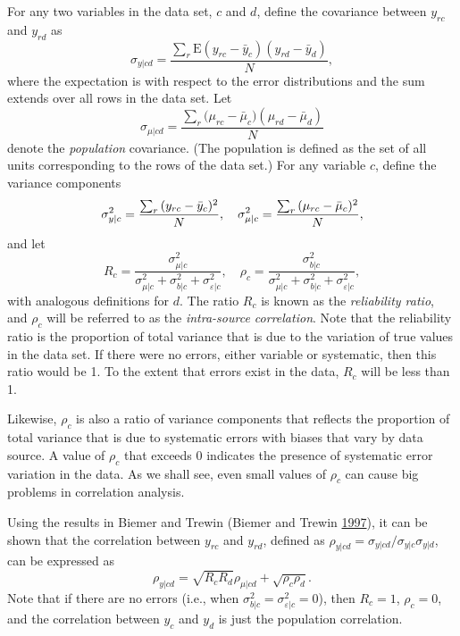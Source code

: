 \documentclass[]{krantz}
\begin{document}
For any two variables in the data set, \(c\) and \(d\), define the
covariance between \(y_{rc}\) and \(y_{rd}\) as \[\label{eq:10-1.6}
\sigma_{y\vert cd} = \frac{\sum\nolimits_r {\mbox{E}(y_{rc} -
\bar{y}_c )(y_{rd} - \bar {y}_d )} }{N},\] where the expectation is with
respect to the error distributions and the sum extends over all rows in
the data set. Let
\[\sigma_{\mu \vert cd} = \frac{\sum\nolimits_r {(\mu_{rc} - \bar{\mu
}_c } )(\mu_{rd} - \bar{\mu }_d )}{N}\] denote the \emph{population}
covariance. (The population is defined as the set of all units
corresponding to the rows of the data set.) For any variable \(c\),
define the variance components
\[\sigma_{y\vert c}^2 = \frac{\sum_r {(y_{rc} -
\bar{y}_c )^2}}{N},\quad \sigma_{\mu \vert c}^2 =\frac{%
\sum_r {(\mu_{rc} - \bar {\mu }_c } )^2}{N},\] and let \[R_c
= \frac{\sigma_{\mu \vert c}^2}{\sigma_{\mu \vert c}^2 +
\sigma_{b\vert c}^2 + \sigma_{\varepsilon \vert c}^2},\quad
\rho_c = \frac{\sigma_{b\vert c}^2}{\sigma_{\mu \vert c}^2 +
\sigma_{b\vert c}^2 + \sigma _{\varepsilon \vert c}^2},\] with analogous
definitions for \(d\). The ratio \(R_{c}\) is known as the
\emph{reliability ratio}, and \(\rho_c\) will be referred to as the
\emph{intra-source correlation}. Note that the reliability ratio is the
proportion of total variance that is due to the variation of true values
in the data set. If there were no errors, either variable or systematic,
then this ratio would be 1. To the extent that errors exist in the data,
\(R_{c}\) will be less than 1.

Likewise, \(\rho_c\) is also a ratio of variance components that
reflects the proportion of total variance that is due to systematic
errors with biases that vary by data source. A value of \(\rho_c\) that
exceeds 0 indicates the presence of systematic error variation in the
data. As we shall see, even small values of \(\rho_c\) can cause big
problems in correlation analysis.

Using the results in Biemer and Trewin (Biemer and Trewin
\protect\hyperlink{ref-biemer1997review}{1997}), it can be shown that
the correlation between \(y_{rc}\) and \(y_{rd}\), defined as
\(\rho_{y\vert cd} = \sigma_{y\vert cd} / \sigma_{y\vert c} \sigma_{y\vert d}\),
can be expressed as
\[\label{eq:10-1.7} \rho_{y\vert cd} = \sqrt {R_c R_d } \rho_{\mu \vert cd} + \sqrt {\rho_c \rho_d }.\]
Note that if there are no errors (i.e., when
\(\sigma_{b\vert c}^2 = \sigma_{\varepsilon \vert c}^2 = 0\)), then
\(R_c = 1\), \(\rho_c =0\), and the correlation between \(y_{c}\) and
\(y_{d}\) is just the population correlation.
\end{document}
